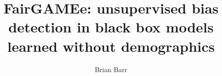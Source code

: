 \documentclass[manuscript,screen,review]{acmart}
\begin{document}
\title{FairGAMEe: unsupervised bias detection in black box models learned without demographics}

\author{Brian Barr}








\end{document}
